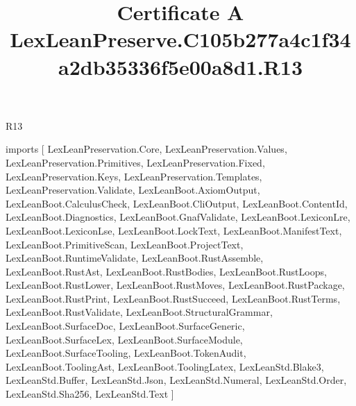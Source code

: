 \begin{lexlean}{R13}
\title{Certificate A LexLeanPreserve.C105b277a4c1f34a2db35336f5e00a8d1.R13}
\begin{coremodule}
imports [
  LexLeanPreservation.Core,
  LexLeanPreservation.Values,
  LexLeanPreservation.Primitives,
  LexLeanPreservation.Fixed,
  LexLeanPreservation.Keys,
  LexLeanPreservation.Templates,
  LexLeanPreservation.Validate,
  LexLeanBoot.AxiomOutput,
  LexLeanBoot.CalculusCheck,
  LexLeanBoot.CliOutput,
  LexLeanBoot.ContentId,
  LexLeanBoot.Diagnostics,
  LexLeanBoot.GnafValidate,
  LexLeanBoot.LexiconLre,
  LexLeanBoot.LexiconLse,
  LexLeanBoot.LockText,
  LexLeanBoot.ManifestText,
  LexLeanBoot.PrimitiveScan,
  LexLeanBoot.ProjectText,
  LexLeanBoot.RuntimeValidate,
  LexLeanBoot.RustAssemble,
  LexLeanBoot.RustAst,
  LexLeanBoot.RustBodies,
  LexLeanBoot.RustLoops,
  LexLeanBoot.RustLower,
  LexLeanBoot.RustMoves,
  LexLeanBoot.RustPackage,
  LexLeanBoot.RustPrint,
  LexLeanBoot.RustSucceed,
  LexLeanBoot.RustTerms,
  LexLeanBoot.RustValidate,
  LexLeanBoot.StructuralGrammar,
  LexLeanBoot.SurfaceDoc,
  LexLeanBoot.SurfaceGeneric,
  LexLeanBoot.SurfaceLex,
  LexLeanBoot.SurfaceModule,
  LexLeanBoot.SurfaceTooling,
  LexLeanBoot.TokenAudit,
  LexLeanBoot.ToolingAst,
  LexLeanBoot.ToolingLatex,
  LexLeanStd.Blake3,
  LexLeanStd.Buffer,
  LexLeanStd.Json,
  LexLeanStd.Numeral,
  LexLeanStd.Order,
  LexLeanStd.Sha256,
  LexLeanStd.Text
]


\end{coremodule}
\end{lexlean}
